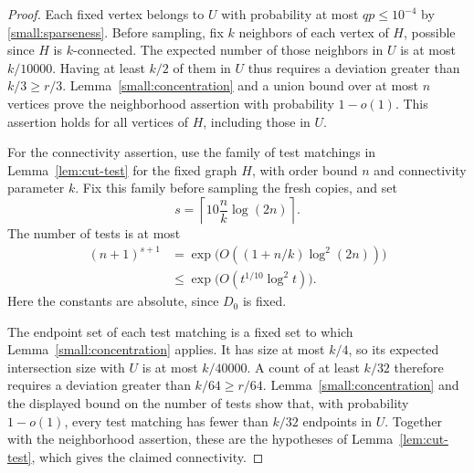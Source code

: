 \begin{proof}
Each fixed vertex belongs to $U$ with probability at most
$qp\le10^{-4}$ by \eqref{small:sparseness}. Before sampling, fix $k$
neighbors of each vertex of $H$, possible since $H$ is $k$-connected.
The expected number of those neighbors in $U$ is at most $k/10000$.
Having at least $k/2$ of them in $U$ thus requires a deviation greater
than $k/3\ge r/3$. Lemma~\ref{small:concentration} and a union bound
over at most $n$ vertices prove the neighborhood assertion with
probability $1-o(1)$. This assertion holds for all vertices of $H$,
including those in $U$.

For the connectivity assertion, use the family of test matchings in
Lemma~\ref{lem:cut-test} for the fixed graph $H$, with order bound $n$
and connectivity parameter $k$. Fix this family before sampling the
fresh copies, and set
\[
 s=\left\lceil10\frac nk\log(2n)\right\rceil.
\]
The number of tests is at most
\begin{align*}
 (n+1)^{s+1}
 &=\exp\bigl(O((1+n/k)\log^2(2n))\bigr)\\
 &\le\exp\bigl(O(t^{1/10}\log^2t)\bigr).
\end{align*}
Here the constants are absolute, since $D_0$ is fixed.

The endpoint set of each test matching is a fixed set to which
Lemma~\ref{small:concentration} applies. It has size at most $k/4$, so
its expected intersection size with $U$ is at most $k/40000$. A count of
at least $k/32$ therefore requires a deviation greater than
$k/64\ge r/64$. Lemma~\ref{small:concentration} and the displayed bound
on the number of tests show that, with probability $1-o(1)$, every test
matching has fewer than $k/32$ endpoints in $U$. Together with the
neighborhood assertion, these are the hypotheses of
Lemma~\ref{lem:cut-test}, which gives the claimed connectivity.
\end{proof}

